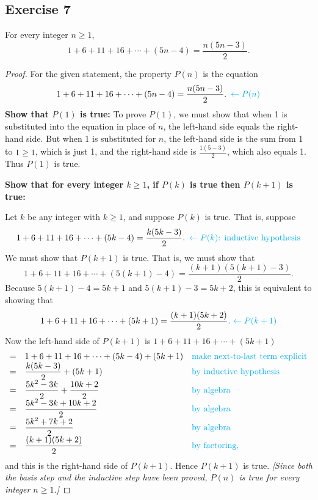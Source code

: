 \documentclass[14pt]{extarticle}
\newcommand{\dps}{\displaystyle}
\newcommand{\from}{\leftarrow}
\newcommand{\cy}{\color{cyan}}
\begin{document}
\subsection{Exercise 7}
For every integer $n \geq 1$,
\[
1 + 6 + 11 + 16 + \cdots + (5n-4) = \frac{n(5n-3)}{2}.
\]
\begin{proof}
For the given statement, the property $P(n)$ is the equation
\[
1 + 6 + 11 + 16 + \cdots + (5n-4) = \frac{n(5n-3)}{2}. \,\,\, {\cy \from P(n)}
\]
{\bf Show that $P(1)$ is true:} To prove $P(1)$, we must show that when 1 is substituted into the equation in place of $n$, the left-hand side equals the right-hand side. But when 1 is substituted for $n$, the left-hand side is the sum from 1 to $1 \geq 1$, which is just 1, and the right-hand side is $\frac{1(5-3)}{2}$, which also equals 1. Thus $P(1)$ is true.

{\bf Show that for every integer $k \geq 1$, if $P(k)$ is true then $P(k + 1)$ is true:}

Let $k$ be any integer with $k \geq 1$, and suppose $P(k)$ is true. That is, suppose
\[
1 + 6 + 11 + 16 + \cdots + (5k-4) = \frac{k(5k-3)}{2}. \,\,\, {\cy \from P(k) \text{: inductive hypothesis}}
\]
We must show that $P(k + 1)$ is true. That is, we must show that
\[
1 + 6 + 11 + 16 + \cdots + (5(k+1)-4) = \frac{(k+1)(5(k+1)-3)}{2}.
\]
Because $5(k + 1) - 4 = 5k+1$ and $5(k + 1) - 3 = 5k+2$, this is equivalent to showing that
\[
1 + 6 + 11 + 16 + \cdots + (5k+1) = \frac{(k+1)(5k+2)}{2}. \,\, {\cy \from P(k + 1)}
\]
Now the left-hand side of $P(k + 1)$ is $1 + 6 + 11 + 16 + \cdots + (5k+1)$
\[
\begin{array}{lll}
= & \dps 1 + 6 + 11 + 16 + \cdots + (5k-4) + (5k+1)  & \text{\cy make next-to-last term explicit} \\
= & \dps \frac{k(5k-3)}{2} + (5k+1) & \text{\cy by inductive hypothesis} \\
= & \dps \frac{5k^2-3k}{2} + \frac{10k+2}{2} & \text{\cy by algebra} \\
= & \dps \frac{5k^2-3k + 10k + 2}{2} & \text{\cy by algebra} \\
= & \dps \frac{5k^2 + 7k + 2}{2} & \text{\cy by algebra} \\
= & \dps \frac{(k+1)(5k+2)}{2} & \text{\cy by factoring,}
\end{array}
\]
and this is the right-hand side of $P(k + 1)$. Hence $P(k + 1)$ is true. {\it [Since both the basis step and the inductive step have been proved, $P(n)$ is true for every integer $n \geq 1$.]}
\end{proof}
\end{document}

